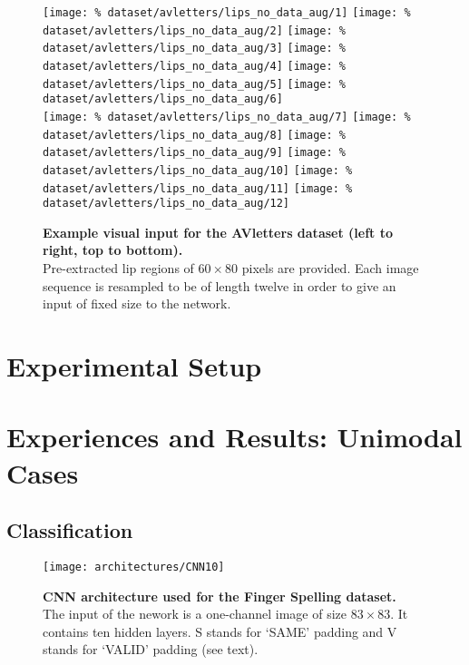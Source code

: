 \begin{figure}[H]
  \centering
  \texttt{[image: \%
    dataset/avletters/lips\_no\_data\_aug/1]}
  \texttt{[image: \%
    dataset/avletters/lips\_no\_data\_aug/2]}
  \texttt{[image: \%
    dataset/avletters/lips\_no\_data\_aug/3]}
  \texttt{[image: \%
    dataset/avletters/lips\_no\_data\_aug/4]}
  \texttt{[image: \%
    dataset/avletters/lips\_no\_data\_aug/5]}
  \texttt{[image: \%
    dataset/avletters/lips\_no\_data\_aug/6]}\\[0.15em]
  \texttt{[image: \%
    dataset/avletters/lips\_no\_data\_aug/7]}
  \texttt{[image: \%
    dataset/avletters/lips\_no\_data\_aug/8]}
  \texttt{[image: \%
    dataset/avletters/lips\_no\_data\_aug/9]}
  \texttt{[image: \%
    dataset/avletters/lips\_no\_data\_aug/10]}
  \texttt{[image: \%
    dataset/avletters/lips\_no\_data\_aug/11]}
  \texttt{[image: \%
    dataset/avletters/lips\_no\_data\_aug/12]}
  \caption{%
    \textbf{Example visual input for the AVletters dataset
      (left to right, top to bottom).}\\[0.1em]
    Pre-extracted lip regions of $60 \times 80$ pixels are provided.
      Each image sequence is resampled to be of length twelve in order to
      give an input of fixed size to the network.}
  \label{fig:avletters_exs}
\end{figure}

\section{Experimental Setup}

\section{Experiences and Results: Unimodal Cases}

\subsection{Classification}

\begin{figure}[H]
  \centering
  \texttt{[image: architectures/CNN10]}\\[-1.5em]
  \caption{%
    \textbf{CNN architecture used for the Finger Spelling  dataset.}
      \\[0.1em]
    The input of the nework is a one-channel image of size $83 \times 83$.
      It contains ten hidden layers. S stands for `SAME' padding
      and V stands for `VALID' padding (see text).}
  \label{fig:CNN10}
\end{figure}

